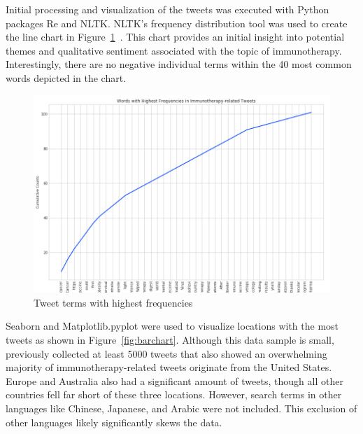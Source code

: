 Initial processing and visualization of the tweets was executed with
Python packages Re and NLTK.  NLTK's frequency distribution tool was
used to create the line chart in
Figure~\ref{fig:linechart}~\cite{bird2016}.  This chart provides an
initial insight into potential themes and qualitative sentiment
associated with the topic of immunotherapy.  Interestingly, there are
no negative individual terms within the 40 most common words depicted
in the chart.

\begin{figure}[H]
\centering
\includegraphics[width=\columnwidth]{images/linechart.png}
\caption{Tweet terms with highest frequencies}
\label{fig:linechart}
\end{figure} 

Seaborn and Matplotlib.pyplot were used to visualize locations with
the most tweets as shown in Figure~\ref{fig:barchart}. Although this
data sample is small, previously collected at least 5000 tweets that
also showed an overwhelming majority of immunotherapy-related tweets
originate from the United States.  Europe and Australia also had a
significant amount of tweets, though all other countries fell far
short of these three locations.  However, search terms in other
languages like Chinese, Japanese, and Arabic were not included.  This
exclusion of other languages likely significantly skews the data.

